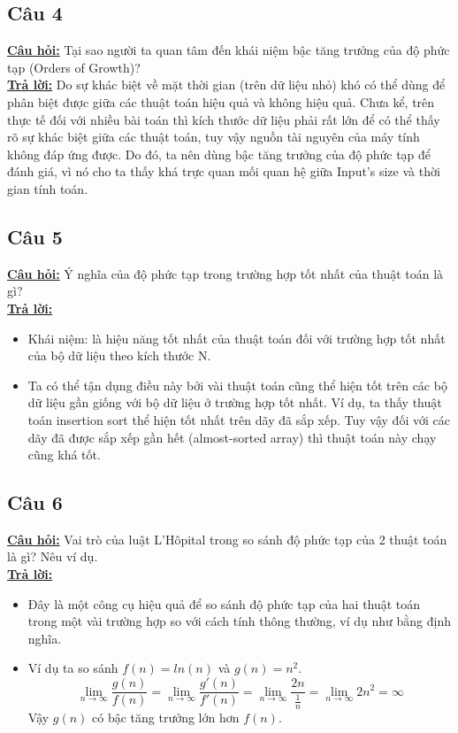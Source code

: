 \documentclass[a4paper 14pt]{extarticle}
\begin{document}
\begin{flushleft}
		\subsection{Câu 4}
		\underline{\textbf{Câu hỏi:}} Tại sao người ta quan tâm đến khái niệm bậc tăng trưởng của độ phức tạp (Orders of Growth)?\\
		\underline{\textbf{Trả lời:}} Do sự khác biệt về mặt thời gian (trên dữ liệu nhỏ) khó có thể dùng để phân biệt được giữa các thuật toán hiệu quả và không hiệu quả. Chưa kể, trên thực tế đối với nhiều bài toán thì kích thước dữ liệu phải rất lớn để có thể thấy rõ sự khác biệt giữa các thuật toán, tuy vậy nguồn tài nguyên của máy tính không đáp ứng được. Do đó, ta nên dùng bậc tăng trưởng của độ phức tạp để đánh giá, vì nó cho ta thấy khá trực quan mối quan hệ giữa Input's size và thời gian tính toán.\\
		\subsection{Câu 5}
		\underline{\textbf{Câu hỏi:}} Ý nghĩa của độ phức tạp trong trường hợp tốt nhất của thuật toán là gì? \\
		\underline{\textbf{Trả lời:}}  \\
		\begin{itemize}
			\item Khái niệm: là hiệu năng tốt nhất của thuật toán đối với trường hợp tốt nhất của bộ dữ liệu theo kích thước N.
			\item Ta có thể tận dụng điều này bởi vài thuật toán cũng thể hiện tốt trên các bộ dữ liệu gần giống với bộ dữ liệu ở trường hợp tốt nhất. Ví dụ, ta thấy thuật toán insertion sort thể hiện tốt nhất trên dãy đã sắp xếp. Tuy vậy đối với các dãy đã được sắp xếp gần hết (almost-sorted array) thì thuật toán này chạy cũng khá tốt.
		\end{itemize}
		\subsection{Câu 6}
		\underline{\textbf{Câu hỏi:}} Vai trò của luật L’Hôpital trong so sánh độ phức tạp của 2 thuật toán là gì? Nêu ví dụ. \\
		\underline{\textbf{Trả lời:}} 
		\begin{itemize}
			\item Đây là một công cụ hiệu quả để so sánh độ phức tạp của hai thuật toán trong một vài trường hợp so với cách tính thông thường, ví dụ như bằng định nghĩa. 
			\item Ví dụ ta so sánh $f(n) = ln(n)$ và $g(n) = n^2$. \\
			\begin{equation}
				\lim_{n\to\infty}\frac{g(n)}{f(n)} = \lim_{n\to\infty}\frac{g'(n)}{f'(n)} = \lim_{n\to\infty}\frac{2n}{\frac{1}{n}} = \lim_{n\to\infty}2n^2 = \infty
			\end{equation}
			Vậy $g(n)$ có bậc tăng trưởng lớn hơn $f(n)$.
		\end{itemize}
	\end{flushleft}
\end{document}
